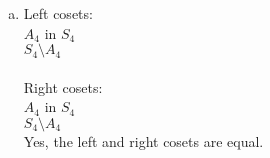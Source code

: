 \begin{enumerate}[(a)]
\item
Left cosets:
\\
$A_4$ in $S_4$
\\
$S_4\setminus A_4$
\\
\\
Right cosets:
\\
$A_4$ in $S_4$
\\
$S_4\setminus A_4$
\\

Yes, the left and right cosets are equal.


\end{enumerate}
